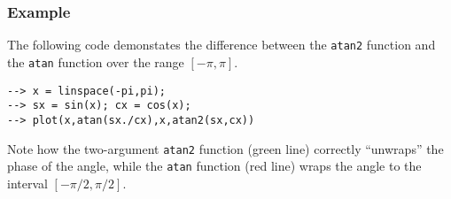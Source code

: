 \subsubsection{Example}
The following code demonstates the difference between the \verb|atan2| 
function and the \verb|atan| function over the range $[-\pi,\pi]$.
\begin{verbatim}
--> x = linspace(-pi,pi);
--> sx = sin(x); cx = cos(x);
--> plot(x,atan(sx./cx),x,atan2(sx,cx))
\end{verbatim}
Note how the two-argument \verb|atan2| function (green line) 
correctly ``unwraps'' the phase of the angle, while the \verb|atan| 
function (red line) wraps the angle to the interval $[-\pi/2,\pi/2]$.
